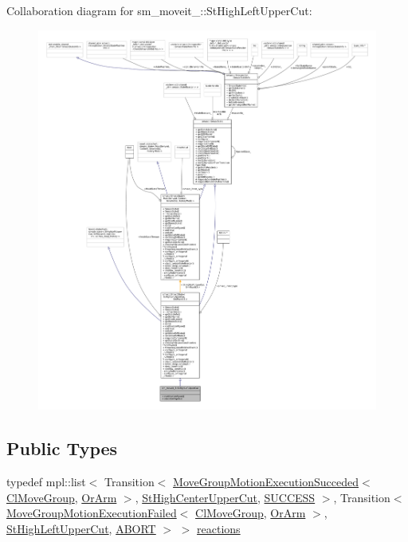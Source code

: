 Collaboration diagram for sm\+\_\+moveit\+\_\+:\+:St\+High\+Left\+Upper\+Cut\+:
\nopagebreak
\begin{figure}[H]
\begin{center}
\leavevmode
\includegraphics[width=350pt]{structsm__moveit__3_1_1StHighLeftUpperCut__coll__graph}
\end{center}
\end{figure}
\subsection*{Public Types}
\begin{DoxyCompactItemize}
\item 
typedef mpl\+::list$<$ Transition$<$ \hyperlink{structmove__group__interface__client_1_1MoveGroupMotionExecutionSucceded}{Move\+Group\+Motion\+Execution\+Succeded}$<$ \hyperlink{classmove__group__interface__client_1_1ClMoveGroup}{Cl\+Move\+Group}, \hyperlink{classsm__moveit__3_1_1OrArm}{Or\+Arm} $>$, \hyperlink{structsm__moveit__3_1_1StHighCenterUpperCut}{St\+High\+Center\+Upper\+Cut}, \hyperlink{classSUCCESS}{S\+U\+C\+C\+E\+SS} $>$, Transition$<$ \hyperlink{structmove__group__interface__client_1_1MoveGroupMotionExecutionFailed}{Move\+Group\+Motion\+Execution\+Failed}$<$ \hyperlink{classmove__group__interface__client_1_1ClMoveGroup}{Cl\+Move\+Group}, \hyperlink{classsm__moveit__3_1_1OrArm}{Or\+Arm} $>$, \hyperlink{structsm__moveit__3_1_1StHighLeftUpperCut}{St\+High\+Left\+Upper\+Cut}, \hyperlink{classABORT}{A\+B\+O\+RT} $>$ $>$ \hyperlink{structsm__moveit__3_1_1StHighLeftUpperCut_a26a27ee4a7e89a86f60919e51ef9a51b}{reactions}
\end{DoxyCompactItemize}
